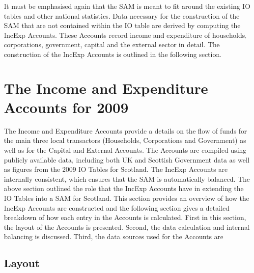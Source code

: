 \bigskip

It must be emphasised again that the SAM is meant to fit around the existing IO tables and other national statistics. Data necessary for the construction of the SAM that are not contained within the IO table are derived by computing the IncExp Accounts. These Accounts record income and expenditure of households, corporations, government, capital and the external sector in detail. The construction of the IncExp Accounts is outlined in the following section.

\newpage
\section{The Income and Expenditure Accounts for 2009}
\label{sec:2.4}

The Income and Expenditure Accounts provide a details on the flow of funds for the main three local transactors (Households, Corporations and Government) as well as for the Capital and External Accounts. The Accounts are compiled using publicly available data, including both UK and Scottish Government data as well as figures from the 2009 IO Tables for Scotland. The IncExp Accounts are internally consistent, which ensures that the SAM is automatically balanced. The above section outlined the role that the IncExp Accounts have in extending the IO Tables into a SAM for Scotland. This section provides an overview of how the IncExp Accounts are constructed and the following section gives a detailed breakdown of how each entry in the Accounts is calculated. First in this section, the layout of the Accounts is presented. Second, the data calculation and internal balancing is discussed. Third, the data sources used for the Accounts are  


\subsection{Layout}
\label{sec:2.4.1}

